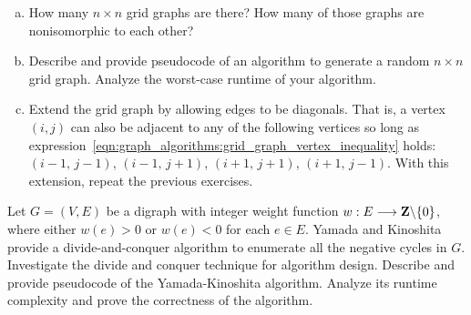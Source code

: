 \begin{problem}
\begin{enumerate}[(a)]
  \item How many $n \times n$ grid graphs are there? How many of those
    graphs are nonisomorphic to each other?

  \item Describe and provide pseudocode of an algorithm to generate a
    random $n \times n$
    grid graph. Analyze the worst-case runtime of
    your algorithm.

  \item Extend the grid graph by allowing edges to
    be diagonals. That is, a vertex $(i,j)$ can also be adjacent to
    any of the following vertices so long as
    expression~\eqref{eqn:graph_algorithms:grid_graph_vertex_inequality}
    holds: $(i-1,\, j-1)$, $(i-1,\, j+1)$, $(i+1,\, j+1)$,
    $(i+1,\, j-1)$. With this extension, repeat the previous
    exercises.
  \end{enumerate}

\item Let $G = (V,E)$ be a digraph with integer weight function
  $w: E \longrightarrow \mathbf{Z} \backslash \{0\}$, where either $w(e) > 0$ or
  $w(e) < 0$ for each $e \in E$. Yamada and
  Kinoshita~\cite{YamadaKinoshita2002}
  provide a divide-and-conquer algorithm to
  enumerate all the negative cycles in
  $G$. Investigate the divide and conquer technique for algorithm
  design. Describe and provide pseudocode of the Yamada-Kinoshita
  algorithm. Analyze its runtime complexity and prove the correctness
  of the algorithm.
\end{problem}

